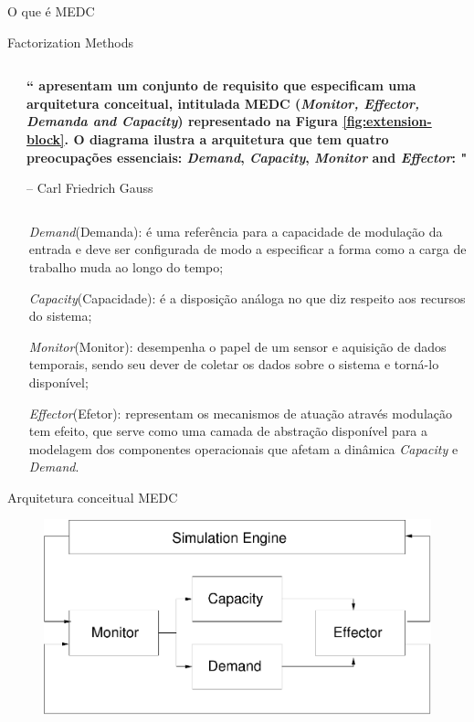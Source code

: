 \begin{frame}{O que é MEDC}
	
\end{frame}

\begin{frame}{Factorization Methods}
	
	\begin{columns}[t]
		\begin{column}{.3\textwidth}
		\end{column}
		\begin{column}{.7\textwidth}
			\textbf{`` apresentam um conjunto de requisito que especificam uma arquitetura conceitual, intitulada MEDC (\textit{Monitor, Effector, Demanda and Capacity}) representado na Figura \ref{fig:extension-block}. O diagrama ilustra a arquitetura que tem quatro preocupações essenciais: \textit{Demand}, \textit{Capacity}, \textit{Monitor} and \textit{Effector}:
				"}
			
			\hfill-- Carl Friedrich Gauss
		\end{column}
	\end{columns}
	
	
	\vspace*{10pt}
	
	\begin{itemize}
		\item[\textit{Demand}(Demanda):] é uma referência para a capacidade de modulação da entrada e deve ser configurada de modo a especificar a forma como a carga de trabalho muda ao longo do tempo;
		\item[\textit{Capacity}(Capacidade):]  é a disposição análoga no que diz respeito aos recursos do sistema;
		\item[\textit{Monitor}(Monitor):] desempenha o papel de um sensor e aquisição de dados temporais, sendo seu dever de coletar os dados sobre o sistema e torná-lo disponível;
		\item[\textit{Effector}(Efetor):] representam os mecanismos de atuação através modulação tem efeito, que serve como uma camada de abstração disponível para a modelagem dos componentes operacionais que afetam a dinâmica \textit{Capacity} e \textit{Demand}.
	\end{itemize}
\end{frame}

\begin{frame}{Arquitetura conceitual MEDC}
	\begin{figure}[htb]
		\centering
		\includegraphics[scale=0.5]{../monograph/images/extension-block.pdf}	
	\end{figure}
\end{frame}